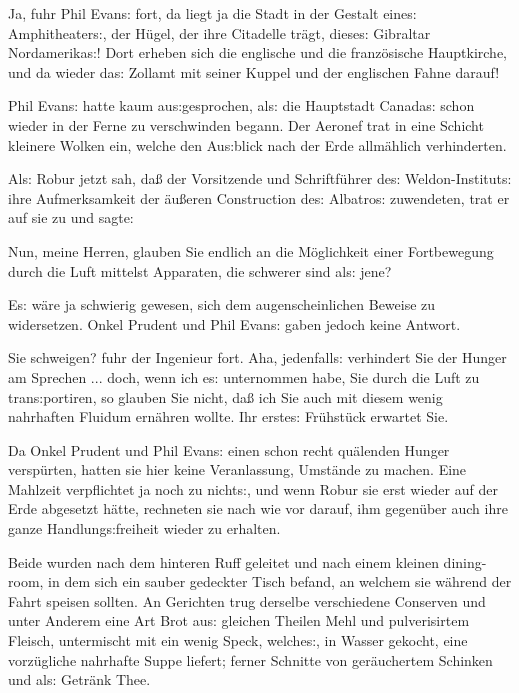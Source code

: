 \documentclass[oneside,12pt]{book}
\newenvironment{antiqua}{\normalfont}{}
\newcommand{\s}{s:}
\begin{document}
{\glqq}Ja, fuhr Phil Evan{\s} fort, da liegt ja die Stadt in der
Gestalt eine{\s} Amphitheater{\s}, der H\"ugel, der ihre Citadelle
tr\"agt, diese{\s} Gibraltar Nordamerika{\s}! Dort erheben sich die
englische und die franz\"osische Hauptkirche, und da wieder da{\s}
Zollamt mit seiner Kuppel und der englischen Fahne darauf!{\grqq}

Phil Evan{\s} hatte kaum au{\s}gesprochen, al{\s} die Hauptstadt
Canada{\s} schon wieder in der Ferne zu verschwinden begann. Der
Aeronef trat in eine Schicht kleinere Wolken ein, welche den
Au{\s}blick nach der Erde allm\"ahlich verhinderten.

Al{\s} Robur jetzt sah, da{\ss} der Vorsitzende und Schriftf\"uhrer
de{\s} Weldon-Institut{\s} ihre Aufmerksamkeit der \"au{\ss}eren
Construction de{\s} {\glqq}Albatro{\s}{\grqq} zuwendeten, trat er auf
sie zu und sagte:

{\glqq}Nun, meine Herren, glauben Sie endlich an die M\"oglichkeit
einer Fortbewegung durch die Luft mittelst Apparaten, die schwerer
sind al{\s} jene?{\grqq}

E{\s} w\"are ja schwierig gewesen, sich dem augenscheinlichen Beweise
zu widersetzen. Onkel Prudent und Phil Evan{\s} gaben jedoch keine
Antwort.

{\glqq}Sie schweigen? fuhr der Ingenieur fort. Aha, jedenfall{\s}
verhindert Sie der Hunger am Sprechen ... doch, wenn ich e{\s}
unternommen habe, Sie durch die Luft zu tran{\s}portiren, so glauben
Sie nicht, da{\ss} ich Sie auch mit diesem wenig nahrhaften Fluidum
ern\"ahren wollte. Ihr erste{\s} Fr\"uhst\"uck erwartet Sie.{\grqq}

Da Onkel Prudent und Phil Evan{\s} einen schon recht qu\"alenden
Hunger versp\"urten, hatten sie hier keine Veranlassung, Umst\"ande
zu machen. Eine Mahlzeit verpflichtet ja noch zu nicht{\s}, und wenn
Robur sie erst wieder auf der Erde abgesetzt h\"atte, rechneten sie
nach wie vor darauf, ihm gegen\"uber auch ihre ganze
Handlung{\s}freiheit wieder zu erhalten.

Beide wurden nach dem hinteren Ruff geleitet und nach einem kleinen
\begin{antiqua}dining-room\end{antiqua}, in dem sich ein sauber
gedeckter Tisch befand, an welchem sie w\"ahrend der Fahrt speisen
sollten. An Gerichten trug derselbe verschiedene Conserven und unter
Anderem eine Art Brot au{\s} gleichen Theilen Mehl und pulverisirtem
Fleisch, untermischt mit ein wenig Speck, welche{\s}, in Wasser
gekocht, eine vorz\"ugliche nahrhafte Suppe liefert; ferner Schnitte
von ger\"auchertem Schinken und al{\s} Getr\"ank Thee.
\end{document}
